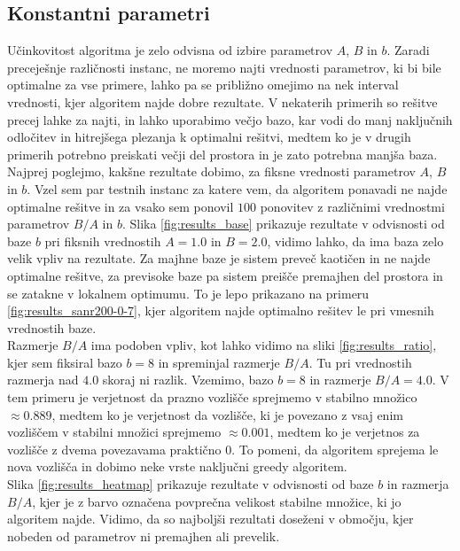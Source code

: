 \documentclass[slovenian, 10pt, titlepage, a4paper]{article}
\begin{document}
    \subsection{Konstantni parametri}
    Učinkovitost algoritma je zelo odvisna od izbire parametrov $A$, $B$ in $b$.
    Zaradi preceješnje različnosti instanc, ne moremo najti vrednosti parametrov, ki bi bile optimalne za vse primere, lahko pa se približno omejimo na nek interval vrednosti, kjer algoritem najde dobre rezultate.
    V nekaterih primerih so rešitve precej lahke za najti, in lahko uporabimo večjo bazo, kar vodi do manj naključnih odločitev in hitrejšega plezanja k optimalni rešitvi, medtem ko je v drugih primerih potrebno preiskati večji del prostora in je zato potrebna manjša baza.\\
    Najprej poglejmo, kakšne rezultate dobimo, za fiksne vrednosti parametrov $A$, $B$ in $b$.
    Vzel sem par testnih instanc za katere vem, da algoritem ponavadi ne najde optimalne rešitve in za vsako sem ponovil $100$ ponovitev z različnimi vrednostmi parametrov $B/A$ in $b$.
    Slika \ref{fig:results_base} prikazuje rezultate v odvisnosti od baze $b$ pri fiksnih vrednostih $A = 1.0$ in $B = 2.0$, vidimo lahko, da ima baza zelo velik vpliv na rezultate.
    Za majhne baze je sistem preveč kaotičen in ne najde optimalne rešitve, za previsoke baze pa sistem preišče premajhen del prostora in se zatakne v lokalnem optimumu.
    To je lepo prikazano na primeru \ref{fig:results_sanr200-0-7}, kjer algoritem najde optimalno rešitev le pri vmesnih vrednostih baze.\\
    Razmerje $B/A$ ima podoben vpliv, kot lahko vidimo na sliki \ref{fig:results_ratio}, kjer sem fiksiral bazo $b = 8$ in spreminjal razmerje $B/A$.
    Tu pri vrednostih razmerja nad $4.0$ skoraj ni razlik.
    Vzemimo, bazo $b = 8$ in razmerje $B/A = 4.0$.
    V tem primeru je verjetnost da prazno vozlišče sprejmemo v stabilno množico $\approx 0.889$, medtem ko je verjetnost da vozlišče, ki je povezano z vsaj enim vozliščem v stabilni množici sprejmemo $\approx 0.001$, medtem ko je verjetnos za vozlišče z dvema povezavama praktično $0$.
    To pomeni, da algoritem sprejema le nova vozlišča in dobimo neke vrste naključni greedy algoritem.\\
    Slika \ref{fig:results_heatmap} prikazuje rezultate v odvisnosti od baze $b$ in razmerja $B/A$, kjer je z barvo označena povprečna velikost stabilne množice, ki jo algoritem najde.
    Vidimo, da so najboljši rezultati doseženi v območju, kjer nobeden od parametrov ni premajhen ali prevelik.
\end{document}
